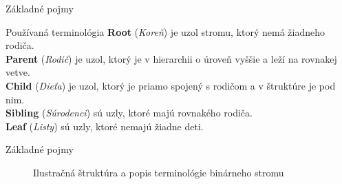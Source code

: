 \documentclass[11pt]{beamer}
\begin{document}
\begin{frame}{Základné pojmy}
\begin{block}{Používaná terminológia}
\textbf{Root} (\emph{Koreň}) je uzol stromu, ktorý nemá žiadneho rodiča.
\\\textbf{Parent} (\emph{Rodič}) je uzol, ktorý je v hierarchii o úroveň vyššie a leží na rovnakej vetve.
\\\textbf{Child} (\emph{Dieťa}) je uzol, ktorý je priamo spojený s rodičom a v štruktúre je pod nim.
\\\textbf{Sibling} (\emph{Súrodenci}) sú uzly, ktoré majú rovnakého rodiča.
\\\textbf{Leaf} (\emph{Listy}) sú uzly, ktoré nemajú žiadne deti.
\end{block}

\end{frame}

\begin{frame}{Základné pojmy}
\begin{figure}[h] \label{BinaryTreeTerminology}
\caption{Ilustračná štruktúra a popis terminológie binárneho stromu}
\end{figure}

\end{frame}
\end{document}
